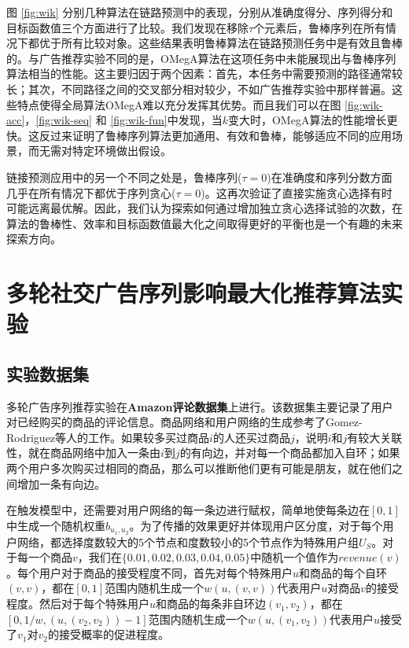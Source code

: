 图 \ref{fig:wik} 分别几种算法在链路预测中的表现，分别从准确度得分、序列得分和目标函数值三个方面进行了比较。我们发现在移除$\tau$个元素后，鲁棒序列在所有情况下都优于所有比较对象。这些结果表明鲁棒算法在链路预测任务中是有效且鲁棒的。与广告推荐实验不同的是，OMegA算法在这项任务中未能展现出与鲁棒序列算法相当的性能。这主要归因于两个因素：首先，本任务中需要预测的路径通常较长；其次，不同路径之间的交叉部分相对较少，不如广告推荐实验中那样普遍。这些特点使得全局算法OMegA难以充分发挥其优势。而且我们可以在图 \ref{fig:wik-acc}，\ref{fig:wik-seq} 和 \ref{fig:wik-fun}中发现，当$k$变大时，OMegA算法的性能增长更快。这反过来证明了鲁棒序列算法更加通用、有效和鲁棒，能够适应不同的应用场景，而无需对特定环境做出假设。

链接预测应用中的另一个不同之处是，鲁棒序列($\tau=0$)在准确度和序列分数方面几乎在所有情况下都优于序列贪心($\tau=0$)。这再次验证了直接实施贪心选择有时可能远离最优解。因此，我们认为探索如何通过增加独立贪心选择试验的次数，在算法的鲁棒性、效率和目标函数值最大化之间取得更好的平衡也是一个有趣的未来探索方向。



\section{多轮社交广告序列影响最大化推荐算法实验}
\label{sec:5_2}

\subsection{实验数据集}

多轮广告序列推荐实验在{\bfseries Amazon评论数据集}\cite{amazon24}上进行。该数据集主要记录了用户对已经购买的商品的评论信息。商品网络和用户网络的生成参考了Gomez-Rodriguez等人\cite{netgen}的工作。如果较多买过商品$i$的人还买过商品$j$，说明$i$和$j$有较大关联性，就在商品网络中加入一条由$i$到$j$的有向边，并对每一个商品都加入自环；如果两个用户多次购买过相同的商品，那么可以推断他们更有可能是朋友，就在他们之间增加一条有向边。

在触发模型中，还需要对用户网络的每一条边进行赋权，简单地使每条边在$[0,1]$中生成一个随机权重$b_{u_1,u_2}$。为了传播的效果更好并体现用户区分度，对于每个用户网络，都选择度数较大的5个节点和度数较小的5个节点作为特殊用户组$U_S$。对于每一个商品$v$，我们在$\{0.01,0.02,0.03,0.04,0.05\}$中随机一个值作为$revenue(v)$。每个用户对于商品的接受程度不同，首先对每个特殊用户$u$和商品的每个自环$(v,v)$，都在$[0,1]$范围内随机生成一个$w(u,(v,v))$代表用户$u$对商品$v$的接受程度。然后对于每个特殊用户$u$和商品的每条非自环边$(v_1,v_2)$，都在$[0,1/w,(u,(v_2,v_2))-1]$范围内随机生成一个$w(u,(v_1,v_2))$代表用户$u$接受了$v_1$对$v_2$的接受概率的促进程度。

